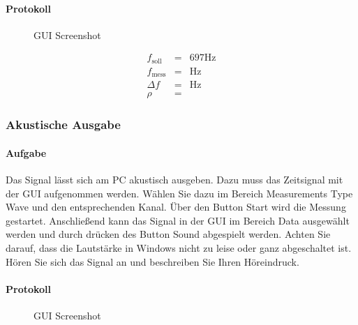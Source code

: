 \documentclass[10pt]{report}
\begin{document}
        \paragraph{Protokoll}
        \begin{center}
            \begin{figure}[H]
              \caption{GUI Screenshot}
            \end{figure}
        \end{center}

        \begin{eqnarray*}
            f_{\text{soll}} &=& 697\si{\hertz}\\
            f_{\text{mess}} &=& \si{\hertz}\\
            \Delta f &=& \si{\hertz}\\
            \rho &=&
        \end{eqnarray*}


        \subsubsection{Akustische Ausgabe}
        \paragraph{Aufgabe}
        Das Signal lässt sich am PC akustisch ausgeben. Dazu muss das Zeitsignal mit
        der GUI aufgenommen werden. Wählen Sie dazu im Bereich Measurements Type
        \glqq{}Wave\grqq{} und den entsprechenden Kanal. Über den Button \glqq{}Start\grqq{} wird die Messung
        gestartet. Anschließend kann das Signal in der GUI im Bereich \glqq{}Data\grqq{} ausgewählt
        werden und durch drücken des Button \glqq{}Sound\grqq{} abgespielt werden. Achten Sie darauf,
        dass die Lautstärke in Windows nicht zu leise oder ganz abgeschaltet ist. Hören
        Sie sich das Signal an und beschreiben Sie Ihren Höreindruck.
        \paragraph{Protokoll}
        \begin{center}
            \begin{figure}[H]
              \caption{GUI Screenshot}
            \end{figure}
        \end{center}
\end{document}
